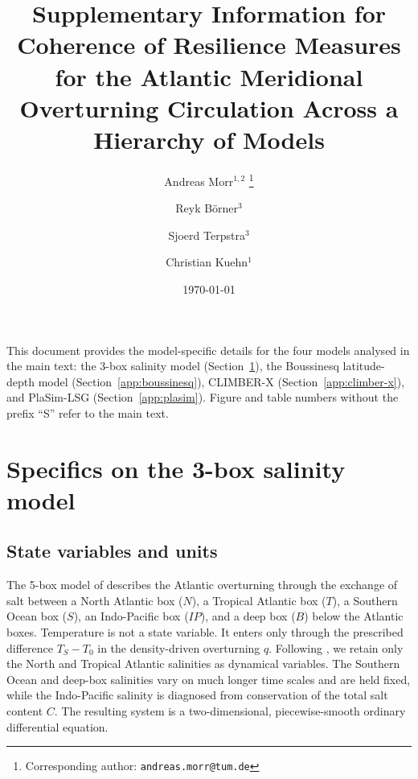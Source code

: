 \documentclass[12pt, a4paper]{article}
\begin{document}
\title{Supplementary Information for\\[6pt]
       Coherence of Resilience Measures for the Atlantic Meridional
       Overturning Circulation Across a Hierarchy of Models}

\author{Andreas Morr$^{1,2}$%
\thanks{Corresponding author: \texttt{andreas.morr@tum.de}}
\and
Reyk Börner$^{3}$
\and
Sjoerd Terpstra$^{3}$
\and
Christian Kuehn$^{1}$}


\date{\today}
\maketitle

This document provides the model-specific details for the four models analysed in the main text: the 3-box salinity model (Section~\ref{app:boxmodel}), the Boussinesq latitude-depth model (Section~\ref{app:boussinesq}), CLIMBER-X (Section~\ref{app:climber-x}), and PlaSim-LSG (Section~\ref{app:plasim}). Figure and table numbers without the prefix ``S'' refer to the main text.

\newpage

\section{Specifics on the 3-box salinity model}
\label{app:boxmodel}

\subsection*{State variables and units}

The 5-box model of \citet{Wood20195BoxModel} describes the Atlantic overturning through the exchange of salt between a North Atlantic box ($N$), a Tropical Atlantic box ($T$), a Southern Ocean box ($S$), an Indo-Pacific box ($IP$), and a deep box ($B$) below the Atlantic boxes. Temperature is not a state variable. It enters only through the prescribed difference $T_S-T_0$ in the density-driven overturning $q$. Following \citet{Alkhayuon2019AMOCRateTipping}, we retain only the North and Tropical Atlantic salinities as dynamical variables. The Southern Ocean and deep-box salinities vary on much longer time scales and are held fixed, while the Indo-Pacific salinity is diagnosed from conservation of the total salt content $C$. The resulting system is a two-dimensional, piecewise-smooth ordinary differential equation.
\end{document}

